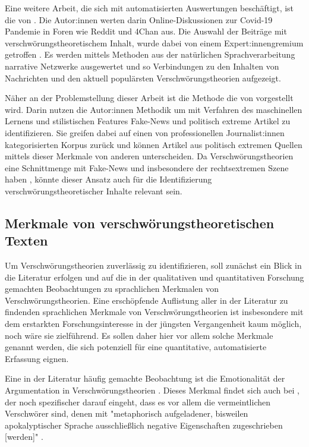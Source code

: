 Eine weitere Arbeit, die sich mit automatisierten Auswertungen beschäftigt, ist die von \textcite{shahsavari_2020}.
Die Autor:innen werten darin Online-Diskussionen zur Covid-19 Pandemie in Foren wie Reddit und 4Chan aus.
Die Auswahl der Beiträge mit verschwörungstheoretischem Inhalt, wurde dabei von einem Expert:innengremium getroffen \parencite[284f]{shahsavari_2020}.
Es werden mittels Methoden aus der natürlichen Sprachverarbeitung narrative Netzwerke ausgewertet und so Verbindungen zu den Inhalten von Nachrichten und den aktuell populärsten Verschwörungstheorien aufgezeigt.

Näher an der Problemstellung dieser Arbeit ist die Methode die von \textcite{potthast_2018} vorgestellt wird.
Darin nutzen die Autor:innen Methodik um mit Verfahren des maschinellen Lernens und stilistischen Features Fake-News und politisch extreme Artikel zu identifizieren.
Sie greifen dabei auf einen von professionellen Journalist:innen kategorisierten Korpus zurück und können Artikel aus politisch extremen Quellen mittels dieser Merkmale von anderen unterscheiden.
Da Verschwörungstheorien eine Schnittmenge mit Fake-News und insbesondere der rechtsextremen Szene haben \parencite[vgl.][]{stumpf_2019}, könnte dieser Ansatz auch für die Identifizierung verschwörungstheoretischer Inhalte relevant sein.

\subsection{Merkmale von verschwörungstheoretischen Texten}

Um Verschwörungstheorien zuverlässig zu identifizieren, soll zunächst ein Blick in die Literatur erfolgen und auf die in der qualitativen und quantitativen Forschung gemachten Beobachtungen zu sprachlichen Merkmalen von Verschwörungstheorien.
Eine erschöpfende Auflistung aller in der Literatur zu findenden sprachlichen Merkmale von Verschwörungstheorien ist insbesondere mit dem erstarkten Forschungsinteresse in der jüngsten Vergangenheit kaum möglich, noch wäre sie zielführend.
Es sollen daher hier vor allem solche Merkmale genannt werden, die sich potenziell für eine quantitative, automatisierte Erfassung eignen.

Eine in der Literatur häufig gemachte Beobachtung ist die Emotionalität der Argumentation in Verschwörungstheorien \parencite[vgl.][10]{miller_2002}.
Dieses Merkmal findet sich auch bei \textcite[][93ff]{butter_2018}, der noch spezifischer darauf eingeht, dass es vor allem die vermeintlichen Verschwörer sind, denen mit "metaphorisch aufgeladener, bisweilen apokalyptischer Sprache ausschließlich negative Eigenschaften zugeschrieben [werden]" \parencite[][93f]{butter_2018}.

